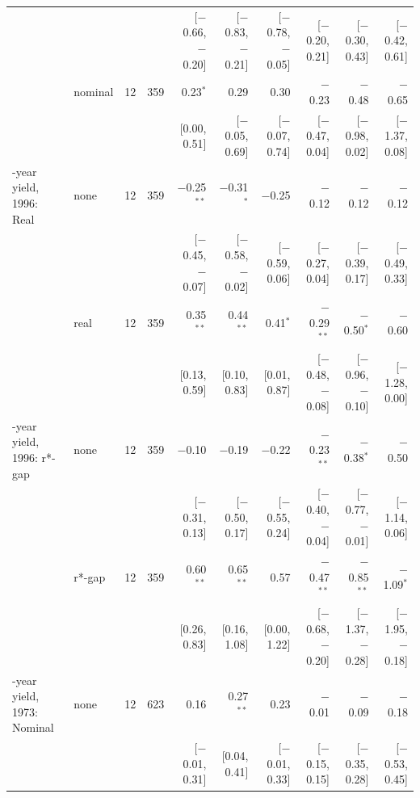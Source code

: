 \begin{table}[tp]
{\begin{tabular}{llcrrrrrrr}
 & & & & {\scriptsize [$-$0.66, $-$0.20]} & {\scriptsize [$-$0.83, $-$0.21]} & {\scriptsize [$-$0.78, $-$0.05]} & {\scriptsize [$-$0.20, 0.21]} & {\scriptsize [$-$0.30, 0.43]} & {\scriptsize [$-$0.42, 0.61]}\\
 & nominal & 12 & 359 & 0.23$^{*}$ & 0.29 & 0.30 & $-$0.23 & $-$0.48 & $-$0.65\\
 & & & & {\scriptsize [0.00, 0.51]} & {\scriptsize [$-$0.05, 0.69]} & {\scriptsize [$-$0.07, 0.74]} & {\scriptsize [$-$0.47, 0.04]} & {\scriptsize [$-$0.98, 0.02]} & {\scriptsize [$-$1.37, 0.08]}\\
\addlinespace
1-year yield, 1996: Real & none & 12 & 359 & $-$0.25$^{**}$ & $-$0.31$^{*}$ & $-$0.25 & $-$0.12 & $-$0.12 & $-$0.12\\
 & & & & {\scriptsize [$-$0.45, $-$0.07]} & {\scriptsize [$-$0.58, $-$0.02]} & {\scriptsize [$-$0.59, 0.06]} & {\scriptsize [$-$0.27, 0.04]} & {\scriptsize [$-$0.39, 0.17]} & {\scriptsize [$-$0.49, 0.33]}\\
 & real & 12 & 359 & 0.35$^{**}$ & 0.44$^{**}$ & 0.41$^{*}$ & $-$0.29$^{**}$ & $-$0.50$^{*}$ & $-$0.60\\
 & & & & {\scriptsize [0.13, 0.59]} & {\scriptsize [0.10, 0.83]} & {\scriptsize [0.01, 0.87]} & {\scriptsize [$-$0.48, $-$0.08]} & {\scriptsize [$-$0.96, $-$0.10]} & {\scriptsize [$-$1.28, 0.00]}\\
\addlinespace
1-year yield, 1996: r*-gap & none & 12 & 359 & $-$0.10 & $-$0.19 & $-$0.22 & $-$0.23$^{**}$ & $-$0.38$^{*}$ & $-$0.50\\
 & & & & {\scriptsize [$-$0.31, 0.13]} & {\scriptsize [$-$0.50, 0.17]} & {\scriptsize [$-$0.55, 0.24]} & {\scriptsize [$-$0.40, $-$0.04]} & {\scriptsize [$-$0.77, $-$0.01]} & {\scriptsize [$-$1.14, 0.06]}\\
 & r*-gap & 12 & 359 & 0.60$^{**}$ & 0.65$^{**}$ & 0.57 & $-$0.47$^{**}$ & $-$0.85$^{**}$ & $-$1.09$^{*}$\\
 & & & & {\scriptsize [0.26, 0.83]} & {\scriptsize [0.16, 1.08]} & {\scriptsize [0.00, 1.22]} & {\scriptsize [$-$0.68, $-$0.20]} & {\scriptsize [$-$1.37, $-$0.28]} & {\scriptsize [$-$1.95, $-$0.18]}\\
\addlinespace
1-year yield, 1973: Nominal & none & 12 & 623 & 0.16 & 0.27$^{**}$ & 0.23 & $-$0.01 & $-$0.09 & $-$0.18\\
 & & & & {\scriptsize [$-$0.01, 0.31]} & {\scriptsize [0.04, 0.41]} & {\scriptsize [$-$0.01, 0.33]} & {\scriptsize [$-$0.15, 0.15]} & {\scriptsize [$-$0.35, 0.28]} & {\scriptsize [$-$0.53, 0.45]}\\

\end{tabular}}
\end{table}
